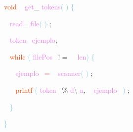 \documentclass[8, usernames, dvipsnames]{beamer}
\begin{document}
\begin{frame}
\textcolor{OrangeRed}{void}
\textcolor{White}{\ }
\textcolor{Violet}{get}\textcolor{Sepia}{\_}
\textcolor{Violet}{tokens}\textcolor{SkyBlue}{(}
\textcolor{SkyBlue}{)}
\textcolor{SkyBlue}{\{ }

 \textcolor{White}{\   }
\textcolor{Violet}{read}\textcolor{Sepia}{\_}
\textcolor{Violet}{file}\textcolor{SkyBlue}{(}
\textcolor{SkyBlue}{)}
\textcolor{Sepia}{;}

 \textcolor{White}{\   }
\textcolor{Violet}{token}\textcolor{White}{\ }
\textcolor{Violet}{ejemplo}\textcolor{Sepia}{;}

 \textcolor{White}{\   }
\textcolor{OrangeRed}{while}
\textcolor{SkyBlue}{(}
\textcolor{Violet}{filePos}\textcolor{White}{\ }
\textcolor{OliveGreen}{$!=$}
\textcolor{White}{\ }
\textcolor{Violet}{len}\textcolor{SkyBlue}{)}
\textcolor{SkyBlue}{\{ }

 \textcolor{White}{\   }
\textcolor{White}{\   }
\textcolor{Violet}{ejemplo}\textcolor{White}{\ }
\textcolor{Salmon}{=}
\textcolor{White}{\ }
\textcolor{Violet}{scanner}\textcolor{SkyBlue}{(}
\textcolor{SkyBlue}{)}
\textcolor{Sepia}{;}

 \textcolor{White}{\   }
\textcolor{White}{\   }
\textcolor{OrangeRed}{printf}
\textcolor{SkyBlue}{(}
\textcolor{Violet}{token}\textcolor{White}{\ }
\textcolor{Apricot}{\%}
\textcolor{Violet}{d}\textcolor{Gray}{\textbackslash }
\textcolor{Violet}{n}\textcolor{Sepia}{,}
\textcolor{White}{\ }
\textcolor{Violet}{ejemplo}\textcolor{White}{\ }
\textcolor{SkyBlue}{)}
\textcolor{Sepia}{;}

 \textcolor{White}{\   }
\textcolor{SkyBlue}{\} }

 
 \textcolor{SkyBlue}{\} }

 \end{frame}
\begin{frame} 
\end{frame} 
\begin{frame} 
\end{frame} 
\end{document}
